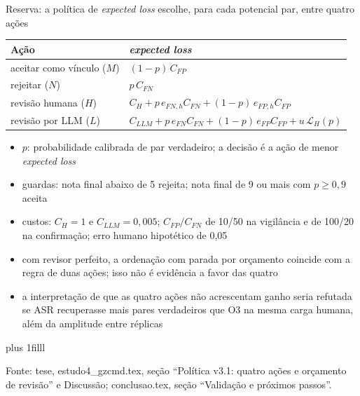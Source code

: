 \documentclass[aspectratio=169,11pt]{beamer}
\let\ressalvatexto\relax
\newcommand{\fontealign}{\raggedright}
\newcommand{\fonte}[2][tese, ]{\par\vskip 0pt plus 1filll
  \ifx\ressalvatexto\relax\else{\raggedright\footnotesize\color{black!70}\textit{Ressalva:} \ressalvatexto\par}\vskip 3pt\fi
  {\fontealign\tiny\color{black!65}Fonte: #1#2.\par}\vskip 3pt\global\let\ressalvatexto\relax}
\newcommand{\itens}[1]{\begin{itemize}#1\end{itemize}}
\begin{document}
\begin{frame}[label=R09]{Reserva: a política de \textit{expected loss} escolhe, para cada potencial par, entre quatro ações}
\footnotesize
\begin{center}
\begin{tabular}{L{.3\textwidth}L{.6\textwidth}}
\toprule
Ação & \textit{expected loss} \\
\midrule
aceitar como vínculo ($M$) & $(1-p)\,C_{FP}$ \\
rejeitar ($N$) & $p\,C_{FN}$ \\
revisão humana ($H$) & $C_H+p\,e_{FN,h}C_{FN}+(1-p)\,e_{FP,h}C_{FP}$ \\
revisão por LLM ($L$) & $C_{LLM}+p\,e_{FN}C_{FN}+(1-p)\,e_{FP}C_{FP}+u\,\mathcal{L}_H(p)$ \\
\bottomrule
\end{tabular}
\end{center}
\itens{\item $p$: probabilidade calibrada de par verdadeiro; a decisão é a ação de menor \textit{expected loss}
\item guardas: nota final abaixo de 5 rejeita; nota final de 9 ou mais com $p\geq 0{,}9$ aceita
\item custos: $C_H=1$ e $C_{LLM}=0{,}005$; $C_{FP}/C_{FN}$ de 10/50 na vigilância e de 100/20 na confirmação; erro humano hipotético de 0,05
\item com revisor perfeito, a ordenação com parada por orçamento coincide com a regra de duas ações; isso não é evidência a favor das quatro
\item a interpretação de que as quatro ações não acrescentam ganho seria refutada se ASR recuperasse mais pares verdadeiros que O3 na mesma carga humana, além da amplitude entre réplicas}
\fonte{estudo4\_gzcmd.tex, seção ``Política v3.1: quatro ações e orçamento de revisão'' e Discussão; conclusao.tex, seção ``Validação e próximos passos''}
\end{frame}
\end{document}
